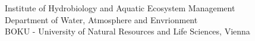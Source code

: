 \begin{titlepage}
\begin{center}
    \end{center}                                            %

    \normalsize                                             %
    Institute of Hydrobiology and Aquatic Ecosystem Management\\
    Department of Water, Atmosphere and Envrionment\\
    BOKU - University of Natural Resources and Life Sciences, Vienna\\





\end{titlepage}


